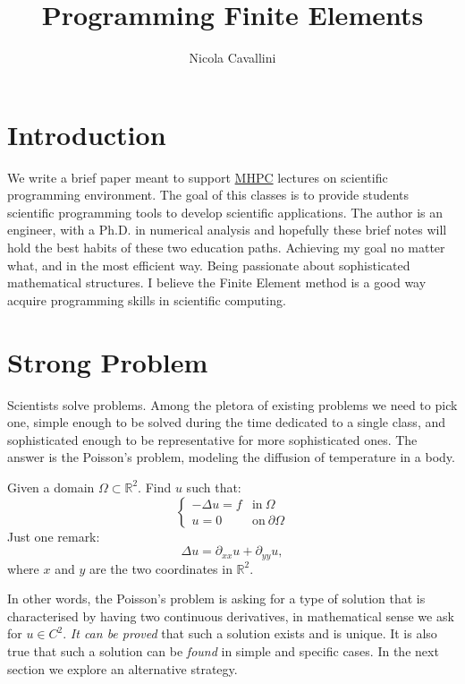 \documentclass[11pt]{amsart}
\title{Programming Finite Elements}
\author{Nicola Cavallini}
\begin{document}
\renewcommand{\theFancyVerbLine}{
  \sffamily\textcolor[rgb]{0.5,0.5,0.5}{\scriptsize\arabic{FancyVerbLine}}}
\maketitle

\section{Introduction}
We write a brief paper meant to support \href{http://www.mhpc.it/}{MHPC} 
lectures on scientific programming environment. The goal of this classes 
is to provide students scientific programming tools to develop scientific applications. 
The author is an engineer, with a Ph.D. in numerical analysis and hopefully these brief 
notes will hold the best habits of these two education paths. Achieving my goal no 
matter what, and in the most efficient way. Being passionate about sophisticated 
mathematical structures. I believe the Finite Element method is a good way acquire 
programming skills in scientific computing.

\section{Strong Problem}
Scientists solve problems. Among the pletora of existing problems 
we need to pick one, simple enough to be solved during the time dedicated to a single 
class, and sophisticated enough to be representative for more sophisticated ones. 
The answer is the Poisson's problem,
modeling the diffusion of temperature in a body.

Given a domain $\Omega\subset \mathbb{R}^2$.
Find $u$ such that:
\[
\left\{
\begin{array}{ll}
-\Delta u = f & \mathrm{in}\ \Omega \\
u = 0  & \mathrm{on}\ \partial\Omega
\end{array}
\right.
\]
Just one remark:
\[
\Delta u = \partial_{xx} u + \partial_{yy} u,
\]
where $x$ and $y$ are the two coordinates in $\mathbb{R}^2$.

In other words, the Poisson's problem is asking for a type of solution 
that is characterised by having two continuous derivatives, in mathematical 
sense we ask for $u\in C^2$. \emph{It can be proved} that such a solution exists and 
is unique. It is also true that such a solution can be \emph{found} in simple and
specific cases. In the next section we explore an alternative strategy.
\end{document}
